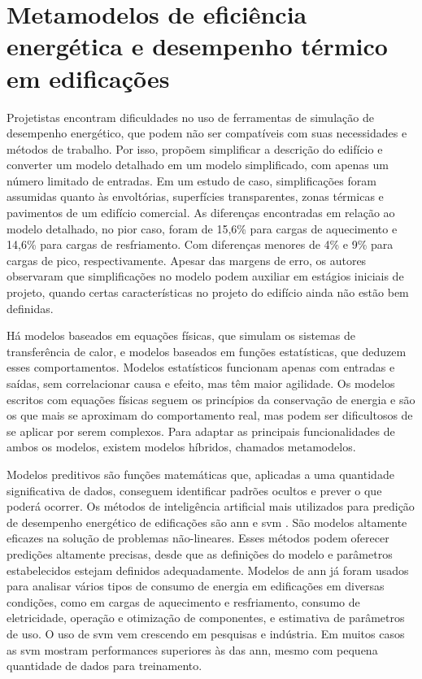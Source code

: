 \section{Metamodelos de eficiência energética e desempenho térmico em edificações}
Projetistas encontram dificuldades no uso de ferramentas de simulação de desempenho energético, que podem não ser compatíveis com suas necessidades e métodos de trabalho. Por isso,  propõem simplificar a descrição do edifício e converter um modelo detalhado em um modelo simplificado, com apenas um número limitado de entradas. Em um estudo de caso, simplificações foram assumidas quanto às envoltórias, superfícies transparentes, zonas térmicas e pavimentos de um edifício comercial. As diferenças encontradas em relação ao modelo detalhado, no pior caso, foram de 15,6\% para cargas de aquecimento e 14,6\% para cargas de resfriamento. Com diferenças menores de 4\% e 9\% para cargas de pico, respectivamente. Apesar das margens de erro, os autores observaram que simplificações no modelo podem auxiliar em estágios iniciais de projeto, quando certas características no projeto do edifício ainda não estão bem definidas.

Há modelos baseados em equações físicas, que simulam os sistemas de transferência de calor, e modelos baseados em funções estatísticas, que deduzem esses comportamentos. Modelos estatísticos funcionam apenas com entradas e saídas, sem correlacionar causa e efeito, mas têm maior agilidade. 
Os modelos escritos com equações físicas seguem os princípios da conservação de energia e são os que mais se aproximam do comportamento real, mas podem ser dificultosos de se aplicar por serem complexos. Para adaptar as principais funcionalidades de ambos os modelos, existem modelos híbridos, chamados metamodelos.

Modelos preditivos são funções matemáticas que, aplicadas a uma quantidade significativa de dados, conseguem identificar padrões ocultos e prever o que poderá ocorrer. Os métodos de inteligência artificial mais utilizados para predição de desempenho energético de edificações são \acrfull{ann} e \acrfull{svm} \cite{Zhao2012}. São modelos altamente eficazes na solução de problemas não-lineares. Esses métodos podem oferecer predições altamente precisas, desde que as definições do modelo e parâmetros estabelecidos estejam definidos adequadamente. Modelos de \acrshort{ann} já foram usados para analisar vários tipos de consumo de energia em edificações em diversas condições, como em cargas de aquecimento e resfriamento, consumo de eletricidade, operação e otimização de componentes, e estimativa de parâmetros de uso. O uso de \acrshort{svm} vem crescendo em pesquisas e indústria. Em muitos casos as \acrshort{svm} mostram performances superiores às das \acrshort{ann}, mesmo com pequena quantidade de dados para treinamento.

